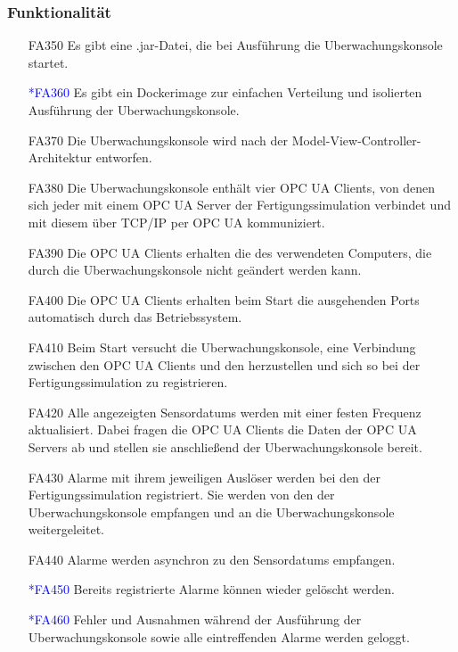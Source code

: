\documentclass[parskip=full]{scrartcl}
\begin{document}
\subsubsection{Funktionalität}
\begin{enumerate}
  \item[FA350] Es gibt eine .jar-Datei, die bei Ausführung die \gls{Uberwachungskonsole} startet.
  \item[\textcolor{blue}{*FA360}] Es gibt ein \gls{Dockerimage} zur einfachen Verteilung und isolierten Ausführung der \gls{Uberwachungskonsole}.
  \item[FA370] Die \gls{Uberwachungskonsole} wird nach der Model-View-Controller-Architektur entworfen.
  \item[FA380] Die \gls{Uberwachungskonsole} enthält vier \glspl{OPC UA Client}, von denen sich jeder mit einem \gls{OPC UA Server} der \gls{Fertigungssimulation} verbindet und mit diesem über \gls{TCP/IP} per
    \gls{OPC  UA} kommuniziert.
  \item[FA390] Die \glspl{OPC UA Client} erhalten die  des verwendeten Computers,
  die durch die \gls{Uberwachungskonsole} nicht geändert werden kann.
  \item[FA400] Die \glspl{OPC UA Client} erhalten beim Start die ausgehenden Ports automatisch durch das Betriebssystem.
  \item[FA410] Beim Start versucht die \gls{Uberwachungskonsole}, eine Verbindung zwischen den \glspl{OPC UA Client} und den  herzustellen und sich so bei der
    \gls{Fertigungssimulation} zu registrieren.
  \item[FA420] Alle angezeigten \glspl{Sensordatum} werden mit einer festen Frequenz aktualisiert. Dabei fragen die \glspl{OPC UA Client} die Daten der \glspl{OPC UA Server}
    ab und stellen sie anschlie{\ss}end der \gls{Uberwachungskonsole} bereit.
  \item[FA430] Alarme mit ihrem jeweiligen Auslöser werden bei den  der \gls{Fertigungssimulation} registriert. Sie werden von den
     der \gls{Uberwachungskonsole} empfangen und an die \gls{Uberwachungskonsole} weitergeleitet.
  \item[FA440] Alarme werden asynchron zu den \glspl{Sensordatum} empfangen.
  \item[\textcolor{blue}{*FA450}] Bereits registrierte Alarme können wieder gelöscht werden.
  \item[\textcolor{blue}{*FA460}] Fehler und Ausnahmen während der Ausführung der \gls{Uberwachungskonsole} sowie alle eintreffenden Alarme werden geloggt.
\end{enumerate}
\end{document}
